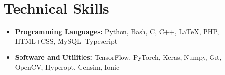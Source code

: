 \section*{Technical Skills}
\begin{itemize}

\item \textbf{Programming Languages:} Python, Bash, C, C++, \LaTeX, PHP, HTML+CSS, MySQL, Typescript
\item \textbf{Software and Utilities:} TensorFlow, PyTorch, Keras, Numpy, Git, OpenCV, Hyperopt, Gensim, Ionic

\end{itemize}

